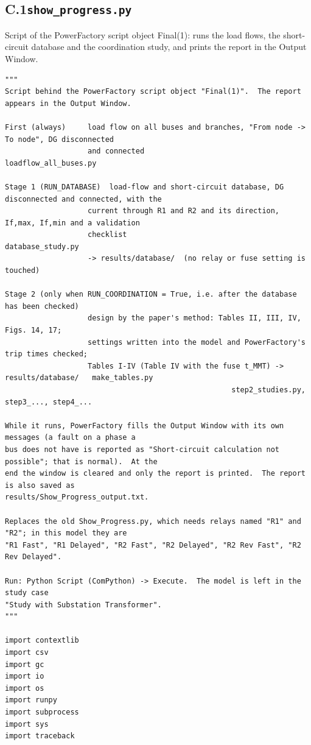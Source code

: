 \documentclass[12pt,a4paper]{article}
\begin{document}
\subsection*{C.1\quad \texttt{show\_progress.py}}
Script of the PowerFactory script object Final(1): runs the load flows, the short-circuit database and the coordination study, and prints the report in the Output Window.
\begin{lstlisting}
"""
Script behind the PowerFactory script object "Final(1)".  The report appears in the Output Window.

First (always)     load flow on all buses and branches, "From node -> To node", DG disconnected
                   and connected                                          loadflow_all_buses.py

Stage 1 (RUN_DATABASE)  load-flow and short-circuit database, DG disconnected and connected, with the
                   current through R1 and R2 and its direction, If,max, If,min and a validation
                   checklist                                                  database_study.py
                   -> results/database/  (no relay or fuse setting is touched)

Stage 2 (only when RUN_COORDINATION = True, i.e. after the database has been checked)
                   design by the paper's method: Tables II, III, IV, Figs. 14, 17;
                   settings written into the model and PowerFactory's trip times checked;
                   Tables I-IV (Table IV with the fuse t_MMT) -> results/database/   make_tables.py
                                                    step2_studies.py, step3_..., step4_...

While it runs, PowerFactory fills the Output Window with its own messages (a fault on a phase a
bus does not have is reported as "Short-circuit calculation not possible"; that is normal).  At the
end the window is cleared and only the report is printed.  The report is also saved as
results/Show_Progress_output.txt.

Replaces the old Show_Progress.py, which needs relays named "R1" and "R2"; in this model they are
"R1 Fast", "R1 Delayed", "R2 Fast", "R2 Delayed", "R2 Rev Fast", "R2 Rev Delayed".

Run: Python Script (ComPython) -> Execute.  The model is left in the study case
"Study with Substation Transformer".
"""

import contextlib
import csv
import gc
import io
import os
import runpy
import subprocess
import sys
import traceback


\end{lstlisting}
\end{document}

